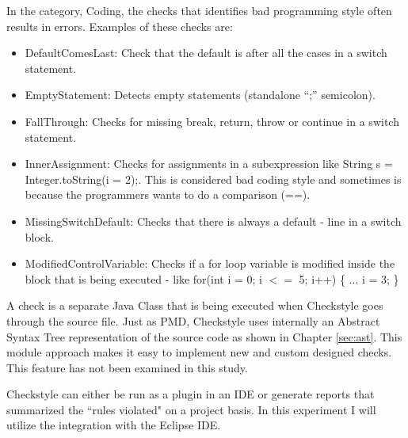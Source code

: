 In the category, Coding, the checks that identifies bad programming style often results in errors. Examples of these checks are:
\begin{itemize}
	\item DefaultComesLast: Check that the default is after all the cases in a switch statement.
	\item EmptyStatement: Detects empty statements (standalone ``;'' semicolon).
	\item FallThrough: Checks for missing break, return, throw or continue in a switch statement.
	\item InnerAssignment: Checks for assignments in a subexpression like String s = Integer.toString(i = 2);. This is considered bad coding style and sometimes is because the programmers wants to do a comparison (==).
	\item MissingSwitchDefault: Checks that there is always a default - line in a switch block.
	\item ModifiedControlVariable: Checks if a for loop variable is modified inside the block that is being executed - like for(int i = 0; i $<=$ 5; i++) \{ ...  i = 3; \}
\end{itemize}

A check is a separate Java Class that is being executed when Checkstyle goes through the source file. Just as PMD, Checkstyle uses internally an Abstract Syntax Tree representation of the source code as shown in Chapter \ref{sec:ast}. This module approach makes it easy to implement new and custom designed checks. This feature has not been examined in this study.

Checkstyle can either be run as a plugin in an IDE or generate reports that summarized the ``rules violated" on a project basis. In this experiment I will utilize the integration with the Eclipse IDE.
